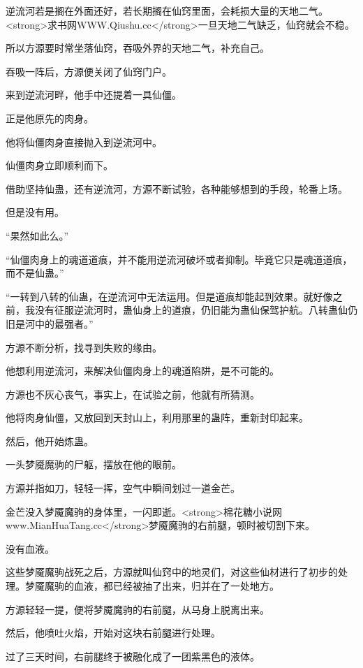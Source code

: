 
\begin{this_body}

逆流河若是搁在外面还好，若长期搁在仙窍里面，会耗损大量的天地二气。<strong>求书网WWW.Qiushu.cc</strong>一旦天地二气缺乏，仙窍就会不稳。

所以方源要时常坐落仙窍，吞吸外界的天地二气，补充自己。

吞吸一阵后，方源便关闭了仙窍门户。

来到逆流河畔，他手中还提着一具仙僵。

正是他原先的肉身。

他将仙僵肉身直接抛入到逆流河中。

仙僵肉身立即顺利而下。

借助坚持仙蛊，还有逆流河，方源不断试验，各种能够想到的手段，轮番上场。

但是没有用。

“果然如此么。”

“仙僵肉身上的魂道道痕，并不能用逆流河破坏或者抑制。毕竟它只是魂道道痕，而不是仙蛊。”

“一转到八转的仙蛊，在逆流河中无法运用。但是道痕却能起到效果。就好像之前，我没有征服逆流河时，蛊仙身上的道痕，仍旧能为蛊仙保驾护航。八转蛊仙仍旧是河中的最强者。”

方源不断分析，找寻到失败的缘由。

他想利用逆流河，来解决仙僵肉身上的魂道陷阱，是不可能的。

方源也不灰心丧气，事实上，在试验之前，他就有所猜测。

他将肉身仙僵，又放回到天封山上，利用那里的蛊阵，重新封印起来。

然后，他开始炼蛊。

一头梦魇魔驹的尸躯，摆放在他的眼前。

方源并指如刀，轻轻一挥，空气中瞬间划过一道金芒。

金芒没入梦魇魔驹的身体里，一闪即逝。<strong>棉花糖小说网www.MianHuaTang.cc</strong>梦魇魔驹的右前腿，顿时被切割下来。

没有血液。

这些梦魇魔驹战死之后，方源就叫仙窍中的地灵们，对这些仙材进行了初步的处理。梦魇魔驹的血液，都已经被抽了出来，归并在了一处地方。

方源轻轻一提，便将梦魇魔驹的右前腿，从马身上脱离出来。

然后，他喷吐火焰，开始对这块右前腿进行处理。

过了三天时间，右前腿终于被融化成了一团紫黑色的液体。


\end{this_body}
